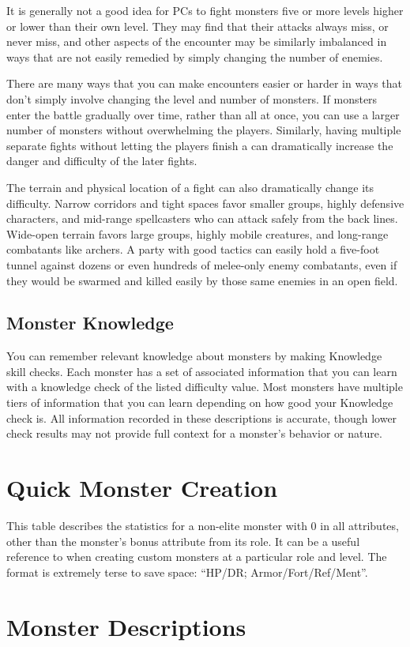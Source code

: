         It is generally not a good idea for PCs to fight monsters five or more levels higher or lower than their own level.
        They may find that their attacks always miss, or never miss, and other aspects of the encounter may be similarly imbalanced in ways that are not easily remedied by simply changing the number of enemies.

        There are many ways that you can make encounters easier or harder in ways that don't simply involve changing the level and number of monsters.
        If monsters enter the battle gradually over time, rather than all at once, you can use a larger number of monsters without overwhelming the players.
        Similarly, having multiple separate fights without letting the players finish a  can dramatically increase the danger and difficulty of the later fights.

        The terrain and physical location of a fight can also dramatically change its difficulty.
        Narrow corridors and tight spaces favor smaller groups, highly defensive characters, and mid-range spellcasters who can attack safely from the back lines.
        Wide-open terrain favors large groups, highly mobile creatures, and long-range combatants like archers.
        A party with good tactics can easily hold a five-foot tunnel against dozens or even hundreds of melee-only enemy combatants, even if they would be swarmed and killed easily by those same enemies in an open field.

    \subsection{Monster Knowledge}
        You can remember relevant knowledge about monsters by making Knowledge skill checks.
        Each monster has a set of associated information that you can learn with a knowledge check of the listed difficulty value.
        Most monsters have multiple tiers of information that you can learn depending on how good your Knowledge check is.
        All information recorded in these descriptions is accurate, though lower check results may not provide full context for a monster's behavior or nature.

\section{Quick Monster Creation}

    This table describes the statistics for a non-elite monster with 0 in all attributes, other than the monster's bonus attribute from its role.
    It can be a useful reference to when creating custom monsters at a particular role and level.
    The format is extremely terse to save space: ``HP/DR; Armor/Fort/Ref/Ment''.

    

\section{Monster Descriptions}


